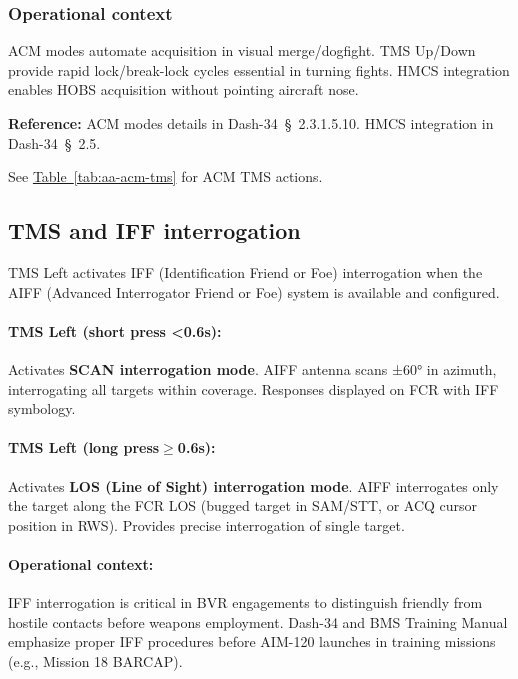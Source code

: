\documentclass[11pt, a4paper, twoside]{report}
\newcommand{\dashref}[1]{Dash-34~\S~#1}
\newcommand{\tabref}[1]{\hyperref[#1]{Table~\ref*{#1}}}
\begin{document}
\subsubsection*{Operational context}
\label{sec:C4-S3-S4-S4}

ACM modes automate acquisition in visual merge/dogfight. TMS Up/Down provide 
rapid lock/break-lock cycles essential in turning fights. HMCS integration 
enables HOBS acquisition without pointing aircraft nose.

\textbf{Reference:} ACM modes details in \dashref{2.3.1.5.10}. HMCS 
integration in \dashref{2.5}.

See \tabref{tab:aa-acm-tms} for ACM TMS actions.

\subsection{TMS and IFF interrogation}
\label{sec:C4-S3-S5}

TMS Left activates IFF (Identification Friend or Foe) interrogation when the AIFF (Advanced Interrogator Friend or Foe) system is available and configured.

\paragraph{TMS Left (short press <0.6s):}
Activates \textbf{SCAN interrogation mode}. AIFF antenna scans ±60° in azimuth, interrogating all targets within coverage. Responses displayed on FCR with IFF symbology.

\paragraph{TMS Left (long press$\geq$0.6s):}
Activates \textbf{LOS (Line of Sight) interrogation mode}. AIFF interrogates only the target along the FCR LOS (bugged target in SAM/STT, or ACQ cursor position in RWS). Provides precise interrogation of single target.

\paragraph{Operational context:}
IFF interrogation is critical in BVR engagements to distinguish friendly from hostile contacts before weapons employment. Dash-34 and BMS Training Manual emphasize proper IFF procedures before AIM-120 launches in training missions (e.g., Mission 18 BARCAP).
\end{document}
